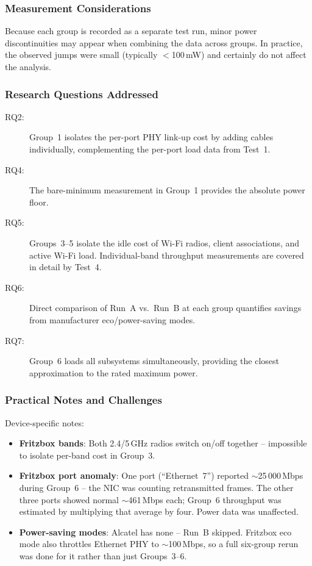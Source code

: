\subsubsection{Measurement Considerations}
Because each group is recorded as a separate test run, minor power discontinuities may appear when combining the data across groups.
In practice, the observed jumps were small (typically $<$100\,mW) and certainly do not affect the analysis.

\subsubsection{Research Questions Addressed}
\begin{description}
    \item[RQ2:] Group~1 isolates the per-port \ac{PHY} link-up cost by adding cables individually, complementing the per-port load data from Test~1.
    \item[RQ4:] The bare-minimum measurement in Group~1 provides the absolute power floor.
    \item[RQ5:] Groups~3--5 isolate the idle cost of Wi-Fi radios, client associations, and active Wi-Fi load. Individual-band throughput measurements are covered in detail by Test~4.
    \item[RQ6:] Direct comparison of Run~A vs.\ Run~B at each group quantifies savings from manufacturer eco/power-saving modes.
    \item[RQ7:] Group~6 loads all subsystems simultaneously, providing the closest approximation to the rated maximum power.
\end{description}

\subsubsection{Practical Notes and Challenges}
Device-specific notes:
\begin{itemize}
    \item \textbf{Fritzbox bands}: Both 2.4/5\,GHz radios switch on/off together -- impossible to isolate per-band cost in Group~3.
    \item \textbf{Fritzbox port anomaly}: One port (``Ethernet~7'') reported $\sim$25\,000\,Mbps during Group~6 -- the \ac{NIC} was counting retransmitted frames. The other three ports showed normal $\sim$461\,Mbps each; Group~6 throughput was estimated by multiplying that average by four. Power data was unaffected.
    \item \textbf{Power-saving modes}: Alcatel has none -- Run~B skipped. Fritzbox eco mode also throttles Ethernet \ac{PHY} to $\sim$100\,Mbps, so a full six-group rerun was done for it rather than just Groups~3--6.
\end{itemize}

